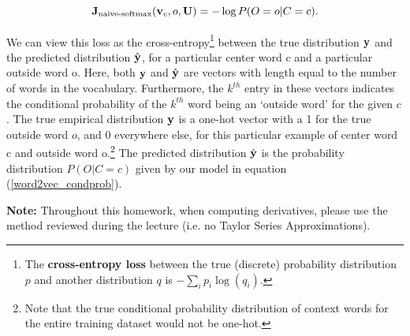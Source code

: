 \begin{equation} 
\mathbf{J}_{\text{naive-softmax}}(\mathbf{v}_c, o, \mathbf{U}) = -\log P(O=o| C=c).
\label{naive-softmax}
\end{equation}

We can view this loss as the cross-entropy\footnote{The \textbf{cross-entropy loss} between the true (discrete) probability distribution $p$ and another distribution $q$ is $-\sum_i p_i \log(q_i)$.} between the true distribution $\mathbf{y}$ and the predicted distribution $\hat{\mathbf{y}}$, for a particular center word c and a particular outside word o. 
Here, both $\mathbf{y}$ and $\hat{\mathbf{y}}$ are vectors with length equal to the number of words in the vocabulary.
Furthermore, the $k^{th}$ entry in these vectors indicates the conditional probability of the $k^{th}$ word being an `outside word' for the given $c$. 
The true empirical distribution $\mathbf{y}$ is a one-hot vector with a 1 for the true outside word $o$, and 0 everywhere else, for this particular example of center word c and outside word o.\footnote{Note that the true conditional probability distribution of context words for the entire training dataset would not be one-hot.}
The predicted distribution $\hat{\mathbf{y}}$ is the probability distribution $P(O|C=c)$ given by our model in equation (\ref{word2vec_condprob}). \newline

\textbf{Note:} Throughout this homework, when computing derivatives, please use the method reviewed during the lecture (i.e. no Taylor Series Approximations).


